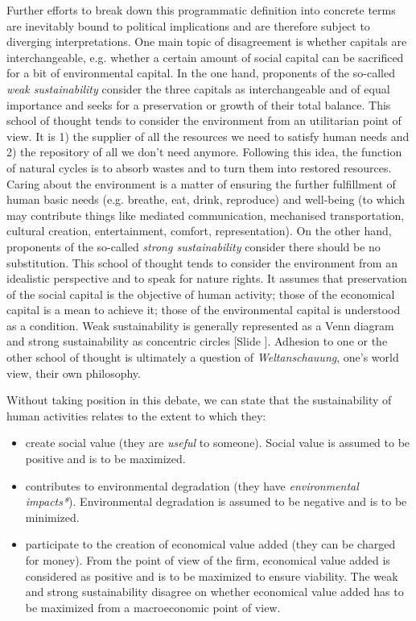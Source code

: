 \documentclass{article}
\newcounter{slide}
\begin{document}
Further efforts to break down this programmatic definition into concrete terms are inevitably bound to political implications and are therefore subject to diverging interpretations. One main topic of disagreement is whether capitals are interchangeable, e.g. whether a certain amount of social capital can be sacrificed for a bit of environmental capital. In the one hand, proponents of the so-called \emph{weak sustainability} consider the three capitals as interchangeable and of equal importance and seeks for a preservation or growth of their total balance. This school of thought tends to consider the environment from an utilitarian point of view. It is 1) the supplier of all the resources we need to satisfy human needs and 2) the repository of all we don't need anymore. Following this idea, the function of natural cycles is to absorb wastes and to turn them into restored resources. Caring about the environment is a matter of ensuring the further fulfillment of human basic needs (e.g. breathe, eat, drink, reproduce) and well-being (to which may contribute things like mediated communication, mechanised transportation, cultural creation, entertainment, comfort, representation). On the other hand, proponents of the so-called \emph{strong sustainability} consider there should be no substitution. This school of thought tends to consider the environment from an idealistic perspective and to speak for nature rights. It assumes that preservation of the social capital is the objective of human activity; those of the economical capital is a mean to achieve it; those of the environmental capital is understood as a condition. Weak sustainability is generally represented as a Venn diagram and strong sustainability as concentric circles {\color{blue}[Slide ]}. Adhesion to one or the other school of thought is ultimately a question of \emph{Weltanschauung}, one's world view, their own philosophy.

Without taking position in this debate, we can state that the sustainability of human activities relates to the extent to which they:
\begin{itemize}
	\item create social value (they are \emph{useful} to someone). Social value is assumed to be positive and is to be maximized. 
	\item contributes to environmental degradation (they have \emph{environmental impacts*}). Environmental degradation is assumed to be negative and is to be minimized.
	\item participate to the creation of economical value added (they can be charged for money). From the point of view of the firm, economical value added is considered as positive and is to be maximized to ensure viability. The weak and strong sustainability disagree on whether economical value added has to be maximized from a macroeconomic point of view.
\end{itemize}
\end{document}
